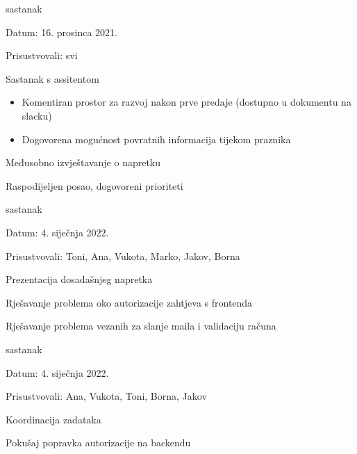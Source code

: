 \begin{packed_enum}
	        \bigskip
	        \item sastanak
	        \item[] \begin{packed_item}
	           \item Datum: 16. prosinca 2021.
	           \item Prisustvovali: svi
	           \item Sastanak s assitentom
	            \begin{itemize}
	                \item Komentiran prostor za razvoj nakon prve predaje (dostupno u dokumentu na slacku)
                	\item Dogovorena mogućnost povratnih informacija tijekom praznika
	            \end{itemize}
	            \item Međusobno izvještavanje o napretku
            	\item Raspodijeljen posao, dogovoreni prioriteti
	        \end{packed_item}
	        
	        \bigskip
	        \item sastanak
	        \item[] \begin{packed_item}
	           \item Datum: 4. siječnja 2022.
	           \item Prisustvovali: Toni, Ana, Vukota, Marko, Jakov, Borna
	           \item Prezentacija dosadašnjeg napretka
	            \item Rješavanje problema oko autorizacije zahtjeva s frontenda
            	\item Rješavanje problema vezanih za slanje maila i validaciju računa
	        \end{packed_item}
	        
	        \bigskip
	        \item sastanak
	        \item[] \begin{packed_item}
	           \item Datum: 4. siječnja 2022.
	           \item Prisustvovali: Ana, Vukota, Toni, Borna, Jakov
	           \item Koordinacija zadataka
	            \item Pokušaj popravka autorizacije na backendu
	        \end{packed_item}
	        

\end{packed_enum}
